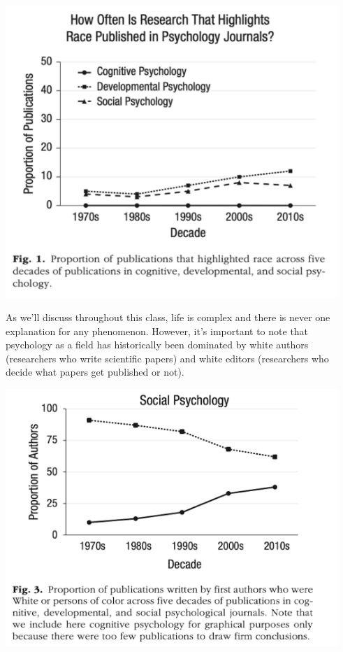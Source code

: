 \documentclass[
  letterpaper,
  DIV=11,
  numbers=noendperiod,
  oneside]{scrreprt}
\begin{document}
\begin{center}
\includegraphics[width=4.94792in,height=\textheight,keepaspectratio]{images/1_RaceResearch.png}
\end{center}

As we'll discuss throughout this class, life is complex and there is
never one explanation for any phenomenon. However, it's important to
note that psychology as a field has historically been dominated by white
authors (researchers who write scientific papers) and white editors
(researchers who decide what papers get published or not).

\begin{center}
\includegraphics[width=4.94792in,height=\textheight,keepaspectratio]{images/1_white_authors.png}
\end{center}
\end{document}
